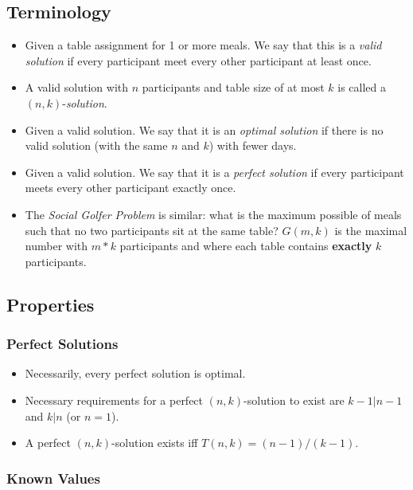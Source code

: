 \documentclass[a4paper]{article}
\begin{document}
\subsection{Terminology}\label{terminology}

\begin{itemize}
\item
  Given a table assignment for 1 or more meals. We say that this is a
  \emph{valid solution} if every participant meet every other
  participant at least once.
\item
  A valid solution with $n$ participants and table size of at
  most $k$ is called a $(n,k)$-\emph{solution}.
\item
  Given a valid solution. We say that it is an \emph{optimal solution}
  if there is no valid solution (with the same $n$ and
  $k$) with fewer days.
\item
  Given a valid solution. We say that it is a \emph{perfect solution} if
  every participant meets every other participant exactly once.
\item
  The \emph{Social Golfer Problem} is similar: what is the maximum
  possible of meals such that no two participants sit at the same table?
  $G(m,k)$ is the maximal number with $m*k$ participants
  and where each table contains \textbf{exactly} $k$
  participants.
\end{itemize}

\subsection{Properties}\label{properties}

\subsubsection{Perfect Solutions}\label{perfect-solutions}

\begin{itemize}
\item
  Necessarily, every perfect solution is optimal.
\item
  Necessary requirements for a perfect $(n,k)$-solution to exist
  are $k-1|n-1$ and
  $k|n$ (or $n=1$).
\item
  A perfect $(n,k)$-solution exists iff
  $T(n,k)=(n-1)/(k-1)$.
\end{itemize}

\subsubsection{Known Values}\label{known-values}
\end{document}
